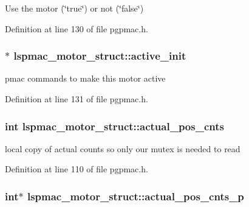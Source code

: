Use the motor (\char`\"{}true\char`\"{}) or not (\char`\"{}false\char`\"{}) 



Definition at line 130 of file pgpmac.\-h.

\hypertarget{structlspmac__motor__struct_ac2a02f137e4a35db816bc728290d3558}{
\subsubsection[{active\-\_\-init}]{$\ast$ lspmac\-\_\-motor\-\_\-struct\-::active\-\_\-init}}\label{structlspmac__motor__struct_ac2a02f137e4a35db816bc728290d3558}


pmac commands to make this motor active 



Definition at line 131 of file pgpmac.\-h.

\hypertarget{structlspmac__motor__struct_ae5c7aea45b9637a1817be246688fd980}{
\subsubsection[{actual\-\_\-pos\-\_\-cnts}]{\setlength{\rightskip}{0pt plus 5cm}int lspmac\-\_\-motor\-\_\-struct\-::actual\-\_\-pos\-\_\-cnts}}\label{structlspmac__motor__struct_ae5c7aea45b9637a1817be246688fd980}


local copy of actual counts so only our mutex is needed to read 



Definition at line 110 of file pgpmac.\-h.

\hypertarget{structlspmac__motor__struct_a312047bb71def5cd2443fecd875eaea5}{
\subsubsection[{actual\-\_\-pos\-\_\-cnts\-\_\-p}]{\setlength{\rightskip}{0pt plus 5cm}int$\ast$ lspmac\-\_\-motor\-\_\-struct\-::actual\-\_\-pos\-\_\-cnts\-\_\-p}}\label{structlspmac__motor__struct_a312047bb71def5cd2443fecd875eaea5}


